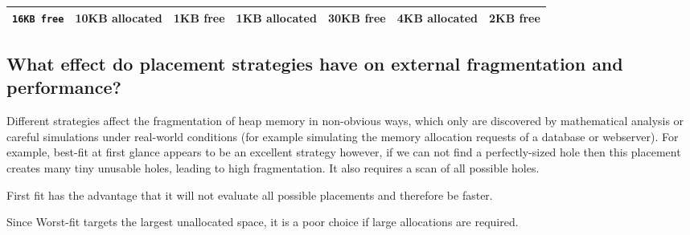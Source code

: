 \begin{longtable}[c]{@{}lllllll@{}}
\toprule
\begin{minipage}[b]{0.04\columnwidth}\raggedright\strut
\texttt{16KB\ free}
\strut\end{minipage} &
\begin{minipage}[b]{0.04\columnwidth}\raggedright\strut
10KB allocated
\strut\end{minipage} &
\begin{minipage}[b]{0.04\columnwidth}\raggedright\strut
1KB free
\strut\end{minipage} &
\begin{minipage}[b]{0.04\columnwidth}\raggedright\strut
1KB allocated
\strut\end{minipage} &
\begin{minipage}[b]{0.04\columnwidth}\raggedright\strut
30KB free
\strut\end{minipage} &
\begin{minipage}[b]{0.04\columnwidth}\raggedright\strut
4KB allocated
\strut\end{minipage} &
\begin{minipage}[b]{0.04\columnwidth}\raggedright\strut
2KB free
\strut\end{minipage}\tabularnewline
\midrule
\endhead
\bottomrule
\end{longtable}

\subsection{What effect do placement strategies have on external
fragmentation and
performance?}\label{what-effect-do-placement-strategies-have-on-external-fragmentation-and-performance}

Different strategies affect the fragmentation of heap memory in
non-obvious ways, which only are discovered by mathematical analysis or
careful simulations under real-world conditions (for example simulating
the memory allocation requests of a database or webserver). For example,
best-fit at first glance appears to be an excellent strategy however, if
we can not find a perfectly-sized hole then this placement creates many
tiny unusable holes, leading to high fragmentation. It also requires a
scan of all possible holes.

First fit has the advantage that it will not evaluate all possible
placements and therefore be faster.

Since Worst-fit targets the largest unallocated space, it is a poor
choice if large allocations are required.

